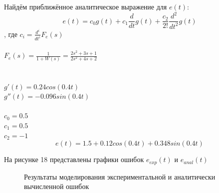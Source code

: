 \documentclass[a4paper, 11pt]{article}
\begin{document}
Найдём приближённое аналитическое выражение для $e(t)$:
\begin{equation}
e(t)=c_0g(t)+c_1\frac{d}{dt}g(t)+\frac{c_2}{2!}\frac{d^2}{dt^2}g(t)
\end{equation}
, где \(\displaystyle c_i=\frac{d^i}{dt^i}F_e(s)\)\\
\\
\(\displaystyle F_e(s)=\frac{1}{1+W(s)}=\frac{2s^2+3s+1}{2s^2+4s+2}\)
\\
\\
\\
$g'(t)=0.24cos(0.4t)$\\
$g''(t)=-0.096sin(0.4t)$\\
\\
$c_0=0.5$\\
$c_1=0.5$\\
$c_2=-1$\\
\begin{equation}
e(t)=1.5+0.12cos(0.4t)+0.348sin(0.4t)
\end{equation}
\par
На рисунке 18 представлены графики ошибок $e_{exp}(t)$ и $e_{anal}(t)$
\begin{figure}[h!]
\centering
{}
\caption{Результаты моделирования экспериментальной и аналитически вычисленной ошибок}
\end{figure}
\end{document}
